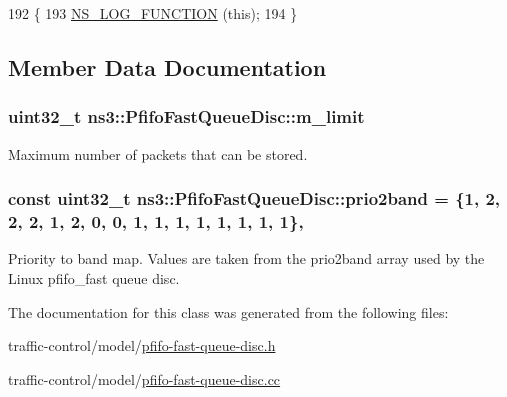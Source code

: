 \begin{DoxyCode}
192 \{
193   \hyperlink{log-macros-disabled_8h_a90b90d5bad1f39cb1b64923ea94c0761}{NS\_LOG\_FUNCTION} (\textcolor{keyword}{this});
194 \}
\end{DoxyCode}


\subsection{Member Data Documentation}
\subsubsection[{\texorpdfstring{m\+\_\+limit}{m_limit}}]{\setlength{\rightskip}{0pt plus 5cm}uint32\+\_\+t ns3\+::\+Pfifo\+Fast\+Queue\+Disc\+::m\+\_\+limit\hspace{0.3cm}{\ttfamily [private]}}\hypertarget{classns3_1_1PfifoFastQueueDisc_ac0c01461b2419ffafef7485e526c1990}{}\label{classns3_1_1PfifoFastQueueDisc_ac0c01461b2419ffafef7485e526c1990}


Maximum number of packets that can be stored. 

\subsubsection[{\texorpdfstring{prio2band}{prio2band}}]{\setlength{\rightskip}{0pt plus 5cm}const uint32\+\_\+t ns3\+::\+Pfifo\+Fast\+Queue\+Disc\+::prio2band = \{1, 2, 2, 2, 1, 2, 0, 0, 1, 1, 1, 1, 1, 1, 1, 1\}\hspace{0.3cm}{\ttfamily [static]}, {\ttfamily [private]}}\hypertarget{classns3_1_1PfifoFastQueueDisc_ae5565927d8c9b16c534480c24c5f38ab}{}\label{classns3_1_1PfifoFastQueueDisc_ae5565927d8c9b16c534480c24c5f38ab}
Priority to band map. Values are taken from the prio2band array used by the Linux pfifo\+\_\+fast queue disc. 

The documentation for this class was generated from the following files\+:\begin{DoxyCompactItemize}
\item 
traffic-\/control/model/\hyperlink{pfifo-fast-queue-disc_8h}{pfifo-\/fast-\/queue-\/disc.\+h}\item 
traffic-\/control/model/\hyperlink{pfifo-fast-queue-disc_8cc}{pfifo-\/fast-\/queue-\/disc.\+cc}\end{DoxyCompactItemize}
